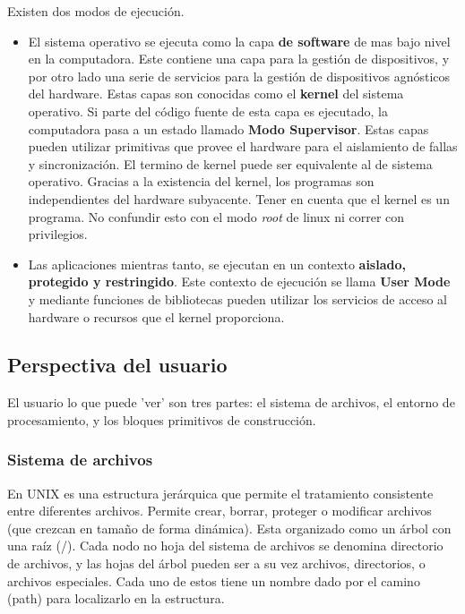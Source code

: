 \documentclass[titlepage,a4paper]{article}
\begin{document}
Existen dos modos de ejecución.
\begin{itemize}
    \item El sistema operativo se ejecuta como la capa \textbf{de software} de mas bajo nivel en la computadora. Este contiene una capa para la gestión de dispositivos, y por otro lado una serie de servicios para la gestión de dispositivos agnósticos del hardware. Estas capas son conocidas como el \textbf{kernel} del sistema operativo. Si parte del código fuente de esta capa es ejecutado, la computadora pasa a un estado llamado \textbf{Modo Supervisor}. Estas capas pueden utilizar primitivas que provee el hardware para el aislamiento de fallas y sincronización. El termino de kernel puede ser equivalente al de sistema operativo. Gracias a la existencia del kernel, los programas son independientes del hardware subyacente. Tener en cuenta que el kernel es un programa. No confundir esto con el modo \textit{root} de linux ni correr con privilegios.
    
    \item Las aplicaciones mientras tanto, se ejecutan en un contexto \textbf{aislado, protegido y restringido}. Este contexto de ejecución se llama \textbf{User Mode} y mediante funciones de bibliotecas pueden utilizar los servicios de acceso al hardware o recursos que el kernel proporciona.

\end{itemize}

\subsection*{Perspectiva del usuario}

El usuario lo que puede 'ver' son tres partes: el sistema de archivos, el entorno de procesamiento, y los bloques primitivos de construcción.

\subsubsection*{Sistema de archivos}

En UNIX es una estructura jerárquica que permite el tratamiento consistente entre diferentes archivos. Permite crear, borrar, proteger o modificar archivos (que crezcan en tamaño de forma dinámica).
Esta organizado como un árbol con una raíz (/). Cada nodo no hoja del sistema de archivos se denomina directorio de archivos, y las hojas del árbol pueden ser a su vez archivos, directorios, o archivos especiales. Cada uno de estos tiene un nombre dado por el camino (path) para localizarlo en la estructura.
\end{document}
